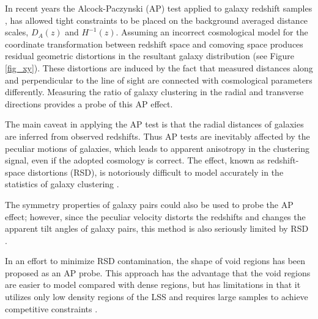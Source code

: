 \documentclass[iop]{emulateapj}
\begin{document}
In recent years the Alcock-Paczynski (AP) test \citep{AP1979} applied to galaxy redshift samples \citep{Outram2004,Blake2011,Alam2016}, 
has allowed tight constraints to be placed on the background averaged distance scales, $D_A(z)$ and $H^{-1}(z)$.  
Assuming an incorrect cosmological model for the coordinate transformation between redshift space and comoving space
produces residual geometric distortions in the resultant galaxy distribution (see  Figure \ref{fig_xy}). 
These distortions are induced by the fact that measured distances along 
and perpendicular to the line of sight are connected with cosmological parameters differently. 
Measuring the ratio of galaxy clustering in the radial and transverse directions provides a probe of this AP effect.


The main caveat in applying the AP test is that 
the radial distances of galaxies are inferred from observed redshifts.
Thus AP tests are inevitably affected by the peculiar motions of galaxies,
which leads to apparent anisotropy in the clustering signal, even if the adopted cosmology is correct.
The effect, known as redshift-space distortions (RSD),
is notoriously difficult to model accurately in the statistics of galaxy clustering \citep{Ballinger1996}.

The symmetry properties of galaxy pairs\cite{Marinoni2010}  could also be used to probe the AP effect;
however, since the peculiar velocity distorts the redshifts and changes the apparent tilt angles of galaxy pairs,
this method is also seriously limited by RSD \citep{Jennings2011}.

In an effort to minimize RSD contamination, the shape of void regions\cite{Ryden1995,LavausWandelt1995}  has been 
proposed as an AP probe. This approach has the advantage that the void regions are easier to model compared with dense regions, but has limitations in that it utilizes only low density regions of the LSS and requires large samples to achieve competitive constraints \citep{Qingqing2016}.

\end{document}
